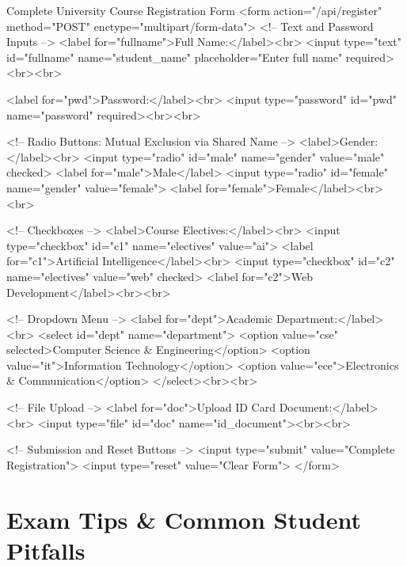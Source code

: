 \begin{htmlcode}{Complete University Course Registration Form}
<form action="/api/register" method="POST" enctype="multipart/form-data">
    <!-- Text and Password Inputs -->
    <label for="fullname">Full Name:</label><br>
    <input type="text" id="fullname" name="student_name" placeholder="Enter full name" required><br><br>

    <label for="pwd">Password:</label><br>
    <input type="password" id="pwd" name="password" required><br><br>

    <!-- Radio Buttons: Mutual Exclusion via Shared Name -->
    <label>Gender:</label><br>
    <input type="radio" id="male" name="gender" value="male" checked>
    <label for="male">Male</label>
    <input type="radio" id="female" name="gender" value="female">
    <label for="female">Female</label><br><br>

    <!-- Checkboxes -->
    <label>Course Electives:</label><br>
    <input type="checkbox" id="c1" name="electives" value="ai">
    <label for="c1">Artificial Intelligence</label><br>
    <input type="checkbox" id="c2" name="electives" value="web" checked>
    <label for="c2">Web Development</label><br><br>

    <!-- Dropdown Menu -->
    <label for="dept">Academic Department:</label><br>
    <select id="dept" name="department">
        <option value="cse" selected>Computer Science & Engineering</option>
        <option value="it">Information Technology</option>
        <option value="ece">Electronics & Communication</option>
    </select><br><br>

    <!-- File Upload -->
    <label for="doc">Upload ID Card Document:</label><br>
    <input type="file" id="doc" name="id_document"><br><br>

    <!-- Submission and Reset Buttons -->
    <input type="submit" value="Complete Registration">
    <input type="reset" value="Clear Form">
</form>
\end{htmlcode}

\section{Exam Tips \& Common Student Pitfalls}

